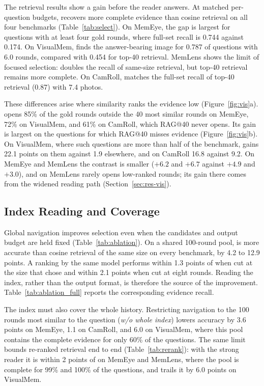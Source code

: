 The retrieval results show a gain before the reader answers. At matched per-question budgets, \qss{} recovers more complete evidence than cosine retrieval on all four benchmarks (Table~\ref{tab:select}). On MemEye, the gap is largest for questions with at least four gold rounds, where full-set recall is 0.744 against 0.174. On VisualMem, \qss{} finds the answer-bearing image for 0.787 of questions with 6.0 rounds, compared with 0.454 for top-40 retrieval. MemLens shows the limit of focused selection: \qss{} doubles the recall of same-size retrieval, but top-40 retrieval remains more complete. On CamRoll, \qss{} matches the full-set recall of top-40 retrieval (0.87) with 7.4 photos.

These differences arise where similarity ranks the evidence low (Figure~\ref{fig:vis}a). \vgs{} opens 85\% of the gold rounds outside the 40 most similar rounds on MemEye, 72\% on VisualMem, and 61\% on CamRoll, which RAG@40 never opens. Its gain is largest on the questions for which RAG@40 misses evidence (Figure~\ref{fig:vis}b). On VisualMem, where such questions are more than half of the benchmark, \vgs{} gains 22.1 points on them against 1.9 elsewhere, and on CamRoll 16.8 against 9.2. On MemEye and MemLens the contrast is smaller ($+6.2$ and $+6.7$ against $+4.9$ and $+3.0$), and on MemLens \vgs{} rarely opens low-ranked rounds; its gain there comes from the widened reading path (Section~\ref{sec:res-vis}).

\subsection{Index Reading and Coverage}
\label{sec:res-ablation}



Global navigation improves selection even when the candidates and output budget are held fixed (Table~\ref{tab:ablation}). On a shared 100-round pool, \qss{} is more accurate than cosine retrieval of the same size on every benchmark, by 4.2 to 12.9 points. A ranking by the same model performs within 1.3 points of \qss{} when cut at the size that \qss{} chose and within 2.1 points when cut at eight rounds. Reading the index, rather than the output format, is therefore the source of the improvement. Table~\ref{tab:ablation_full} reports the corresponding evidence recall.

The index must also cover the whole history. Restricting navigation to the 100 rounds most similar to the question (\emph{w/o whole index}) lowers accuracy by 3.6 points on MemEye, 1.1 on CamRoll, and 6.0 on VisualMem, where this pool contains the complete evidence for only 60\% of the questions. The same limit bounds re-ranked retrieval end to end (Table~\ref{tab:rerank}): with the strong reader it is within 2 points of \vgs{} on MemEye and MemLens, where the pool is complete for 99\% and 100\% of the questions, and trails it by 6.0 points on VisualMem.


